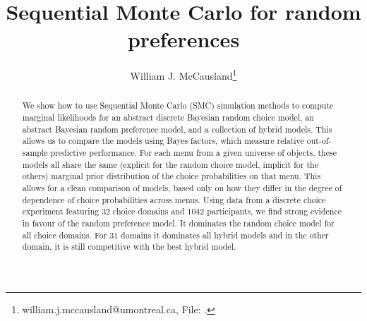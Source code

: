 \documentclass[11pt,letter]{article}
\title{Sequential Monte Carlo for random preferences}
\author[1]{William J. McCausland\thanks{william.j.mccausland@umontreal.ca, File: \texttt{\currfilename}.}}
\affil[1]{Universit\'e de Montr\'eal}
\begin{document}
\maketitle

\newtheorem{thm}{Theorem}
\newtheorem{defn}{Definition}

\begin{abstract}
We show how to use Sequential Monte Carlo (SMC) simulation methods to compute marginal likelihoods for an abstract discrete Bayesian random choice model, an abstract Bayesian random preference model, and a collection of hybrid models.
This allows us to compare the models using Bayes factors, which measure relative out-of-sample predictive performance.
For each menu from a given universe of objects, these models all share the same (explicit for the random choice model, implicit for the others) marginal prior distribution of the choice probabilities on that menu.
This allows for a clean comparison of models, based only on how they differ in the degree of dependence of choice probabilities across menus.
Using data from a discrete choice experiment featuring 32 choice domains and 1042 participants, we find strong evidence in favour of the random preference model.
It dominates the random choice model for all choice domains.
For 31 domains it dominates all hybrid models and in the other domain, it is still competitive with the best hybrid model.
\end{abstract}
\end{document}
